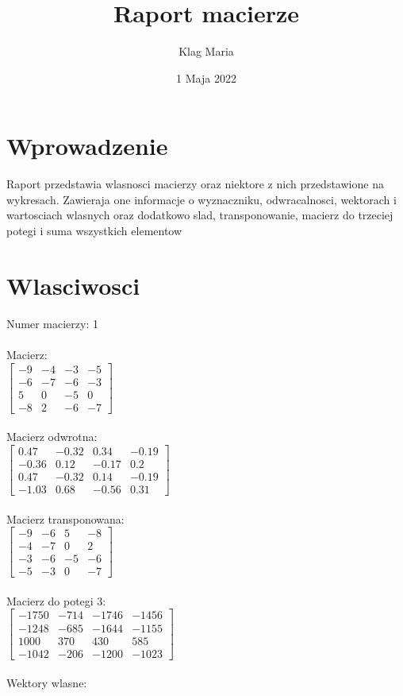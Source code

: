 \documentclass[a4paper,12pt]{article}
\title{Raport macierze}\author{Klag Maria}\date{1 Maja 2022}
\begin{document}
 
\maketitle \newpage
\section{Wprowadzenie} Raport przedstawia wlasnosci macierzy oraz niektore z nich przedstawione na wykresach. Zawieraja
one informacje o wyznaczniku, odwracalnosci, wektorach i wartosciach wlasnych oraz dodatkowo slad,
transponowanie, macierz do trzeciej potegi i suma wszystkich elementow \newpage
\section{Wlasciwosci} 
Numer macierzy:
1
\\
\\
Macierz:\\

$\begin{bmatrix} -9&-4&-3&-5\\-6&-7&-6&-3\\5&0&-5&0\\-8&2&-6&-7 \end{bmatrix}$
\\
\\
Macierz odwrotna:\\

$\begin{bmatrix} 0.47&-0.32&0.34&-0.19\\-0.36&0.12&-0.17&0.2\\0.47&-0.32&0.14&-0.19\\-1.03&0.68&-0.56&0.31 \end{bmatrix}$
\\
\\
Macierz transponowana:\\

$\begin{bmatrix} -9&-6&5&-8\\-4&-7&0&2\\-3&-6&-5&-6\\-5&-3&0&-7 \end{bmatrix}$
\\
\\
Macierz do potegi 3:\\

$\begin{bmatrix} -1750&-714&-1746&-1456\\-1248&-685&-1644&-1155\\1000&370&430&585\\-1042&-206&-1200&-1023 \end{bmatrix}$
\\
\\
Wektory wlasne:\\
\end{document}
